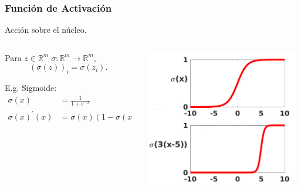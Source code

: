 \documentclass[aspectratio=1610]{beamer}
\begin{document}
\begin{frame}
  \frametitle{Funci\'on de Activaci\'on}
  Acci\'on sobre el n\'ucleo.
   \begin{columns}
     \begin{column}{0.3\textwidth}
       Para $z\in \mathbb{R}^m \; \sigma: \mathbb{R}^m\to \mathbb{R}^m$,
       \begin{displaymath}
         (\sigma(z))_i = \sigma(z_i).
       \end{displaymath}

       E.g. Sigmoide:
         \begin{align*}
           \sigma(x) &= \frac{1}{1+e^{-x}} \\
           \sigma(x)^\prime(x) &= \sigma(x)(1-\sigma(x))
         \end{align*}
         
     \end{column}

     \begin{column}{0.6\textwidth}  %
       \begin{center}
         \includegraphics[width=8cm,height=6cm]{fig3}       
       \end{center}
     \end{column}
   \end{columns}
 \end{frame}
\end{document}

